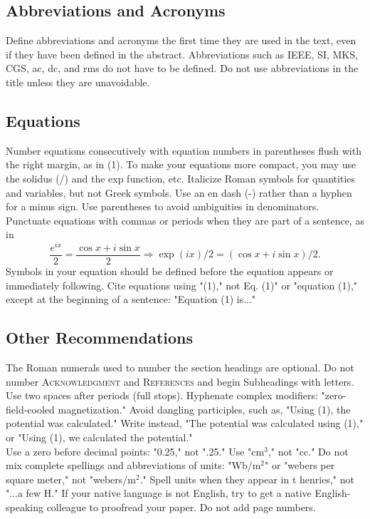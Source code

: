 \documentclass[conference,letterpaper]{IEEEtran}
\begin{document}
\subsection{Abbreviations and Acronyms}
Define abbreviations and acronyms the first time they are used in
the text, even if they have been defined in the abstract.
Abbreviations such as IEEE, SI, MKS, CGS, ac, dc, and rms do not
have to be defined. Do not use abbreviations in the title unless
they are unavoidable.
\subsection{Equations}
Number equations consecutively with equation numbers in
parentheses flush with the right margin, as in (1). To make your
equations more compact, you may use the solidus (/) and the exp
function, etc. Italicize Roman symbols for quantities and
variables, but not Greek symbols. Use an en dash (-) rather than a
hyphen for a minus sign. Use parentheses to avoid ambiguities in
denominators. Punctuate equations with commas or periods when they
are part of a sentence, as in
\begin{equation}
\frac{e^{ix}}{2} = \frac{\cos{x}+i\sin{x}}{2}\Rightarrow \exp(ix)/2=(\cos{x}+i\sin{x})/2.
\label{ecuacion}
\end{equation}
Symbols in your equation should be defined before the equation
appears or immediately following. Cite equations using "(1)," not
Eq. (1)" or "equation (1)," except at the beginning of a sentence:
"Equation (1) is..."
\subsection{Other Recommendations}
The Roman numerals used to number the section headings are
optional. Do not number \textsc{Acknowledgment} and \textsc{References} and begin
Subheadings with letters. Use two spaces after periods (full
stops). Hyphenate complex modifiers: "zero-field-cooled
magnetization." Avoid dangling participles, such as, "Using (1),
the potential was calculated." Write instead, "The potential was
calculated using (1)," or "Using (1), we calculated the
potential."\\
Use a zero before decimal points:  "0.25," not ".25."
Use "cm$^{3}$," not "cc." Do not mix complete spellings and
abbreviations of units: "Wb/m$^{2}$" or "webers per square meter," not
"webers/m$^{2}$." Spell units when they appear in t
henries," not "...a few H." If your native language is not English,
try to get a native English-speaking colleague to proofread your
paper. Do not add page numbers.
\end{document}
